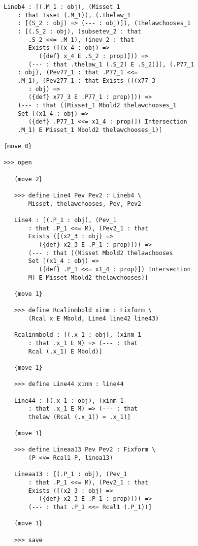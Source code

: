 \documentclass[12pt]{article}
\begin{document}
\begin{verbatim}
   Lineb4 : [(.M_1 : obj), (Misset_1 
       : that Isset (.M_1)), (.thelaw_1 
       : [(S_2 : obj) => (--- : obj)]), (thelawchooses_1 
       : [(.S_2 : obj), (subsetev_2 : that 
          .S_2 <<= .M_1), (inev_2 : that 
          Exists ([(x_4 : obj) => 
             ({def} x_4 E .S_2 : prop)])) => 
          (--- : that .thelaw_1 (.S_2) E .S_2)]), (.P77_1 
       : obj), (Pev77_1 : that .P77_1 <<= 
       .M_1), (Pev277_1 : that Exists ([(x77_3 
          : obj) => 
          ({def} x77_3 E .P77_1 : prop)])) => 
       (--- : that ((Misset_1 Mbold2 thelawchooses_1 
       Set [(x1_4 : obj) => 
          ({def} .P77_1 <<= x1_4 : prop)]) Intersection 
       .M_1) E Misset_1 Mbold2 thelawchooses_1)]

   {move 0}

   >>> open

      {move 2}

      >>> define Line4 Pev Pev2 : Lineb4 \
          Misset, thelawchooses, Pev, Pev2

      Line4 : [(.P_1 : obj), (Pev_1 
          : that .P_1 <<= M), (Pev2_1 : that 
          Exists ([(x2_3 : obj) => 
             ({def} x2_3 E .P_1 : prop)])) => 
          (--- : that ((Misset Mbold2 thelawchooses 
          Set [(x1_4 : obj) => 
             ({def} .P_1 <<= x1_4 : prop)]) Intersection 
          M) E Misset Mbold2 thelawchooses)]

      {move 1}

      >>> define Rcalinmbold xinm : Fixform \
          (Rcal x E Mbold, Line4 line42 line43)

      Rcalinmbold : [(.x_1 : obj), (xinm_1 
          : that .x_1 E M) => (--- : that 
          Rcal (.x_1) E Mbold)]

      {move 1}

      >>> define Line44 xinm : line44

      Line44 : [(.x_1 : obj), (xinm_1 
          : that .x_1 E M) => (--- : that 
          thelaw (Rcal (.x_1)) = .x_1)]

      {move 1}

      >>> define Lineaa13 Pev Pev2 : Fixform \
          (P <<= Rcal1 P, linea13)

      Lineaa13 : [(.P_1 : obj), (Pev_1 
          : that .P_1 <<= M), (Pev2_1 : that 
          Exists ([(x2_3 : obj) => 
             ({def} x2_3 E .P_1 : prop)])) => 
          (--- : that .P_1 <<= Rcal1 (.P_1))]

      {move 1}

      >>> save


\end{verbatim}
\end{document}
